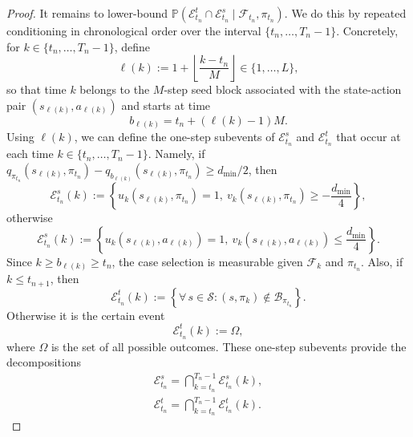 \begin{proof}
It remains to lower-bound $\mathbb P(\mathcal E^t_{t_n} \cap \mathcal E^s_{t_n} \mid \mathcal F_{t_n}, \pi_{t_n})$. We do this by repeated conditioning in chronological order over the interval $\{t_n, \dots, T_n-1\}$.
Concretely, for $k \in \{t_n, \dots, T_n-1\}$, define
\[
\ell(k) := 1 + \left\lfloor \frac{k-t_n}{M} \right\rfloor \in \{1,\dots,L\} ,
\]
so that time \(k\) belongs to the \(M\)-step seed block associated with the state-action pair \((s_{\ell(k)},a_{\ell(k)})\) and starts at time
\[
b_{\ell(k)} = t_n + (\ell(k)-1) M.
\]
Using $\ell(k)$, we can define the one-step subevents 
of \(\mathcal E^s_{t_n}\) and \(\mathcal E^t_{t_n}\) that occur at each time $k \in \{t_n, \dots, T_n-1\}$.
Namely, if $q_{\pi_{t_n}} (s_{\ell(k)},\pi_{t_n} ) - q_{b_{\ell(k)}}(s_{\ell(k)},\pi_{t_n} ) \ge d_{\min}/2$,
then
\[
\mathcal E^s_{t_n}(k)
:=
\left\{
u_{k}(s_{\ell(k)},\pi_{t_n} )=1,\ 
v_{k}(s_{\ell(k)},\pi_{t_n} ) \ge -\dfrac{d_{\min}}{4}
\right\} ,
\]
otherwise
\[
\mathcal E^s_{t_n}(k)
:=
\left\{
u_{k}(s_{\ell(k)},a_{\ell(k)})=1,\ 
v_{k}(s_{\ell(k)},a_{\ell(k)}) \le \dfrac{d_{\min}}{4}
\right\} .
\]
Since \(k \ge b_{\ell(k)} \ge t_n\), the case selection is measurable given $\mathcal F_{k}$ and $\pi_{t_n}$.
Also, if $k \le t_{n+1}$, then
\[
\mathcal E^t_{t_n}(k)
:=
\left\{
\forall \, s \in \mathcal S : 
(s,\pi_k) \notin \mathcal B_{\pi_{t_n}}
\right\} .
\]
Otherwise it is the certain event
\[
\mathcal E^t_{t_n}(k)
:= \Omega ,
\]
where $\Omega$ is the set of all possible outcomes.
These one-step subevents provide the decompositions
\begin{align*}  
\mathcal E^s_{t_n} = \bigcap_{k=t_n}^{T_n-1}\mathcal E^s_{t_n}(k),
\\
\mathcal E^t_{t_n} = \bigcap_{k=t_n}^{T_n-1}\mathcal E^t_{t_n}(k).
\end{align*}



\end{proof}
